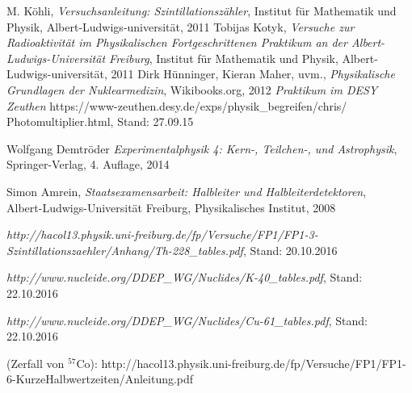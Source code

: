 \documentclass[12pt,listof=totoc]{scrartcl}
\begin{document}
\thispagestyle{empty}
\begin{thebibliography}{9}

	M. Köhli,
	\emph{Versuchsanleitung: Szintillationszähler},
	Institut für Mathematik und Physik,
	Albert-Ludwigs-universität,
	2011
	Tobijas Kotyk,
	\emph{Versuche zur Radioaktivität im Physikalischen Fortgeschrittenen Praktikum an der Albert-Ludwigs-Universität Freiburg},
	Institut für Mathematik und Physik,
	Albert-Ludwigs-universität,
	2011
	Dirk Hünninger, Kieran Maher, uvm.,
	\emph{Physikalische Grundlagen der Nuklearmedizin},
	Wikibooks.org,
	2012
	\emph{Praktikum im DESY Zeuthen}
	https://www-zeuthen.desy.de/exps/physik\_begreifen/chris/\\Photomultiplier.html,
	Stand: 27.09.15
	
Wolfgang Demtröder
 \emph{Experimentalphysik 4: Kern-, Teilchen-, und Astrophysik},
 Springer-Verlag,
 4. Auflage,
 2014
 
 Simon Amrein,
 \emph{Staatsexamensarbeit: Halbleiter und Halbleiterdetektoren},\\
 Albert-Ludwigs-Universität Freiburg,
 Physikalisches Institut,
 2008
 
\emph{http://hacol13.physik.uni-freiburg.de/fp/Versuche/FP1/FP1-3-Szintillationszaehler/Anhang/Th-228\_tables.pdf}, Stand: 20.10.2016

\emph{http://www.nucleide.org/DDEP\_WG/Nuclides/K-40\_tables.pdf}, Stand: 22.10.2016

\emph{http://www.nucleide.org/DDEP\_WG/Nuclides/Cu-61\_tables.pdf}, Stand: 22.10.2016

(Zerfall von $^{57}$Co): http://hacol13.physik.uni-freiburg.de/fp/Versuche/FP1/FP1-6-KurzeHalbwertzeiten/Anleitung.pdf
\end{thebibliography}
\end{document}
